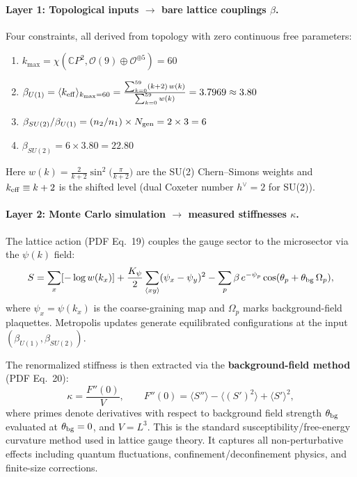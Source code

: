 \paragraph{Layer 1: Topological inputs $\to$ bare lattice couplings $\beta$.}
Four constraints, all derived from topology with zero continuous free parameters:
\begin{enumerate}
\item $k_{\max} = \chi(\mathbb{C}P^2, \mathcal{O}(9) \oplus \mathcal{O}^{\oplus 5}) = 60$
\item $\beta_{U(1)} = \langle k_{\rm eff} \rangle_{k_{\max}=60}
      = \frac{\sum_{k=0}^{59}(k+2)\,w(k)}{\sum_{k=0}^{59}w(k)} = 3.7969 \approx 3.80$
\item $\beta_{SU(2)}/\beta_{U(1)} = (n_2/n_1) \times N_{\rm gen} = 2 \times 3 = 6$
\item $\beta_{SU(2)} = 6 \times 3.80 = 22.80$ \quad [derived]
\end{enumerate}
Here $w(k) = \frac{2}{k+2}\sin^2\!\bigl(\frac{\pi}{k+2}\bigr)$ are the SU(2) Chern--Simons
weights and $k_{\rm eff} \equiv k + 2$ is the shifted level (dual Coxeter number $h^\vee = 2$
for SU(2)).

\paragraph{Layer 2: Monte Carlo simulation $\to$ measured stiffnesses $\kappa$.}
The lattice action (PDF Eq.~19) couples the gauge sector to the microsector
via the $\psi(k)$ field:
\begin{equation}
S = \sum_x [-\log w(k_x)]
  + \frac{K_\psi}{2}\sum_{\langle xy \rangle}(\psi_x - \psi_y)^2
  - \sum_p \beta\, e^{-\psi_p} \cos(\theta_p + \theta_{\rm bg}\,\Omega_p),
\end{equation}
where $\psi_x = \psi(k_x)$ is the coarse-graining map and $\Omega_p$ marks
background-field plaquettes. Metropolis updates generate equilibrated
configurations at the input $(\beta_{U(1)}, \beta_{SU(2)})$.

The renormalized stiffness is then extracted via the \textbf{background-field method}
(PDF Eq.~20):
\begin{equation}\label{eq:kappa-extraction}
\boxed{\kappa = \frac{F''(0)}{V}}, \qquad
F''(0) = \langle S'' \rangle - \langle (S')^2 \rangle + \langle S' \rangle^2,
\end{equation}
where primes denote derivatives with respect to background field strength
$\theta_{\rm bg}$ evaluated at $\theta_{\rm bg} = 0$, and $V = L^3$.
This is the standard susceptibility/free-energy curvature method used in
lattice gauge theory. It captures all non-perturbative effects including
quantum fluctuations, confinement/deconfinement physics, and finite-size
corrections.

